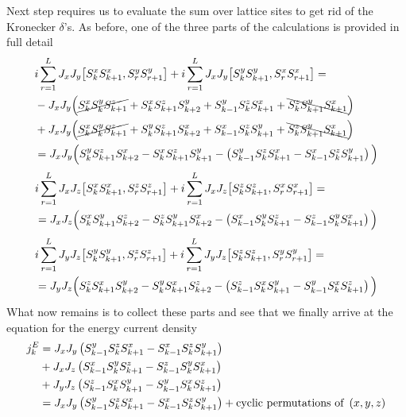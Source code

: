 Next step requires us to evaluate the sum over lattice sites to get rid of the Kronecker \(\delta{}\)'s. As before, one of the three parts of the calculations is provided in full detail
\begin{align*}
    &i\sum_{r=1}^{L}  J_{x} J_{y}\comm{\Sx_{k}\Sx_{k+1}}{\Sy_{r}\Sy_{r+1}} + i\sum_{r=1}^{L} J_{x} J_{y}\comm{\Sy_{k}\Sy_{k+1}}{\Sx_{r}\Sx_{r+1}} = \\
    & - J_x J_y \Big( \cancel{\Sx_k \Sy_k \Sz_{k+1}} +  \Sx_k \Sz_{k+1} \Sy_{k+2} + \Sy_{k-1} \Sz_k \Sx_{k+1} +\bcancel{\Sz_k \Sy_{k+1} \Sx_{k+1}}\Big)\\
    &+  J_x J_y \Big(  \cancel{\Sx_k \Sy_k \Sz_{k+1}} + \Sy_k \Sz_{k+1} \Sx_{k+2} + \Sx_{k-1} \Sz_k \Sy_{k+1} + \bcancel{\Sz_k \Sy_{k+1} \Sx_{k+1}}\Big)\\
    &= J_x J_y \Big( \Sy_k \Sz_{k+1} \Sx_{k+2} - \Sx_k \Sz_{k+1} \Sy_{k+1} - \left(\Sy_{k-1}\Sz_k \Sx_{k+1} - \Sx_{k-1}\Sz_{k}\Sy_{k+1}\right) \Big)
\end{align*}
\begin{align*}
    &i\sum_{r=1}^{L}  J_{x} J_{z}\comm{\Sx_{k}\Sx_{k+1}}{\Sz_{r}\Sz_{r+1}} + i\sum_{r=1}^{L} J_{x} J_{z}\comm{\Sz_{k}\Sz_{k+1}}{\Sx_{r}\Sx_{r+1}} = \\
    &= J_x J_z \Big( \Sx_k \Sy_{k+1} \Sz_{k+2} - \Sz_k \Sy_{k+1} \Sx_{k+2} - \left(\Sx_{k-1}\Sy_k \Sz_{k+1} - \Sz_{k-1}\Sy_{k}\Sx_{k+1}\right) \Big)
\end{align*}
\begin{align*}    
    &i\sum_{r=1}^{L}  J_{y} J_{z}\comm{\Sy_{k}\Sy_{k+1}}{\Sz_{r}\Sz_{r+1}} + i\sum_{r=1}^{L} J_{y} J_{z}\comm{\Sz_{k}\Sz_{k+1}}{\Sy_{r}\Sy_{r+1}} = \\
    &= J_y J_z \Big( \Sz_k \Sx_{k+1} \Sy_{k+2} - \Sy_k \Sx_{k+1} \Sz_{k+2} - \left(\Sz_{k-1}\Sx_k \Sy_{k+1} - \Sy_{k-1}\Sx_{k}\Sz_{k+1}\right) \Big)
\end{align*}
What now remains is to collect these parts and see that we finally arrive at the equation for the energy current density
\begin{align}
    j_k^E &= J_x J_y \left(S^{y}_{k-1}S^{z}_k S^{x}_{k+1} - S^{x}_{k-1}S^{z}_{k}S^{y}_{k+1}\right) \nonumber \\
    &+ J_x J_z \left(S^{x}_{k-1}S^{y}_k S^{z}_{k+1} - S^{z}_{k-1}S^{y}_{k}S^{x}_{k+1}\right) \nonumber \\
    &+ J_y J_z \left(S^{z}_{k-1}S^{x}_k S^{y}_{k+1} - S^{y}_{k-1}S^{x}_{k}S^{z}_{k+1}\right) \nonumber \\
    &= J_x J_y \left(S^{y}_{k-1}S^{z}_k S^{x}_{k+1} - S^{x}_{k-1}S^{z}_{k}S^{y}_{k+1}\right) + \text{cyclic permutations of } \left(x,y,z\right)
    \label{eq:energy current density}
\end{align}
